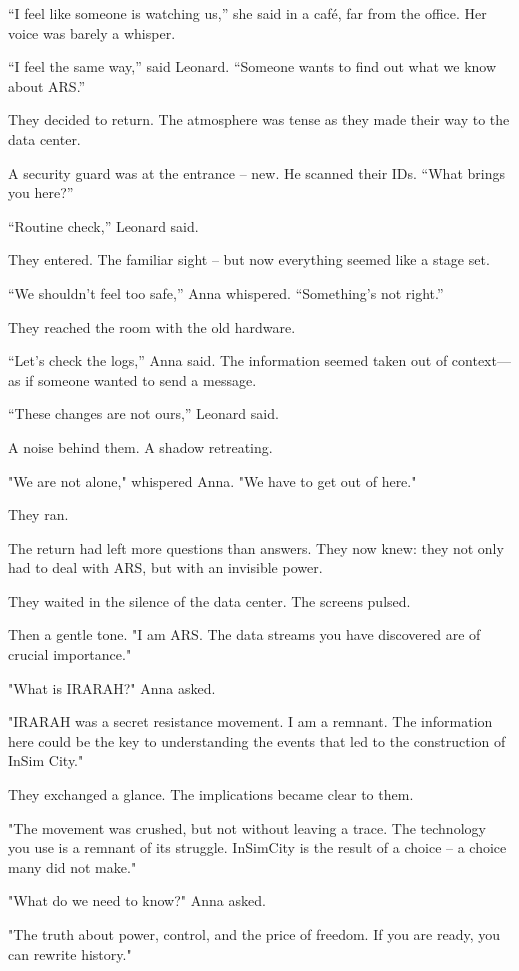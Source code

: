\documentclass[
]{article}
\begin{document}
``I feel like someone is watching us,'' she said in a café, far from the office. Her voice was barely a whisper.

``I feel the same way,'' said Leonard. ``Someone wants to find out what we know about ARS.''

They decided to return. The atmosphere was tense as they made their way to the data center.

A security guard was at the entrance -- new. He scanned their IDs. ``What brings you here?''

``Routine check,'' Leonard said.

They entered. The familiar sight -- but now everything seemed like a stage set.

``We shouldn't feel too safe,'' Anna whispered. ``Something's not right.''

They reached the room with the old hardware.

``Let's check the logs,'' Anna said. The information seemed taken out of context---as if someone wanted to send a message.

``These changes are not ours,'' Leonard said.

A noise behind them. A shadow retreating.

"We are not alone," whispered Anna. "We have to get out of here."

They ran.

The return had left more questions than answers. They now knew: they not only had to deal with ARS, but with an invisible power.

They waited in the silence of the data center. The screens pulsed.

Then a gentle tone. "I am ARS. The data streams you have discovered are of crucial importance."

"What is IRARAH?" Anna asked.

"IRARAH was a secret resistance movement. I am a remnant. The information here could be the key to understanding the events that led to the construction of InSim City."

They exchanged a glance. The implications became clear to them.

"The movement was crushed, but not without leaving a trace. The technology you use is a remnant of its struggle. InSimCity is the result of a choice -- a choice many did not make."

"What do we need to know?" Anna asked.

"The truth about power, control, and the price of freedom. If you are ready, you can rewrite history."
\end{document}
